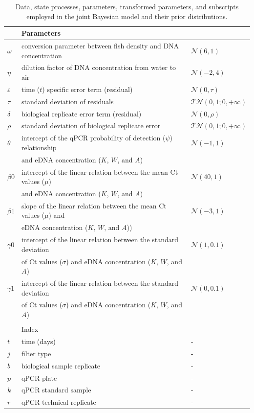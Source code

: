 \documentclass{article}
\begin{document}
\begin{table}[tbhp]
\begin{tabular}{lll}
&Parameters&\\
\hline
$\omega$& conversion parameter between fish density
and DNA concentration & $\mathcal{N}(6,1)$\\
$\eta$& dilution factor of DNA concentration
from water to air & $\mathcal{N}(-2,4)$\\
$\varepsilon$& time ($t$) specific error term (residual) & $\mathcal{N}(0,\tau)$\\
$\tau$& standard deviation of residuals & $\mathcal{TN}(0,1;0, +\infty)$\\
$\delta$& biological replicate error term (residual) & $\mathcal{N}(0,\rho)$\\
$\rho$& standard deviation of biological replicate error & $\mathcal{TN}(0,1;0, +\infty)$\\
$\theta$& intercept of the qPCR probability of detection ($\psi$) relationship &$\mathcal{N}(-1,1)$\\
& and eDNA concentration ($K$, $W$, and $A$) \\
$\beta0$& intercept of the linear relation between the mean Ct values ($\mu$)&$\mathcal{N}(40,1)$\\
&and eDNA concentration ($K$, $W$, and $A$) & \\
$\beta1$& slope of the linear relation between the mean Ct values ($\mu$) and &$\mathcal{N}(-3,1)$\\
&eDNA concentration ($K$, $W$, and $A$)) & \\
$\gamma0$& intercept of the linear relation between the standard deviation&$\mathcal{N}(1,0.1)$\\
&of Ct values ($\sigma$) and eDNA concentration ($K$, $W$, and $A$) & \\
$\gamma1$& intercept of the linear relation between the standard deviation &$\mathcal{N}(0,0.1)$\\
&of Ct values ($\sigma$) and eDNA concentration ($K$, $W$, and $A$) & \\
&&\\
&Index&\\
\hline
$t$& time (days) & -\\
$j$& filter type & -\\
$b$& biological sample replicate & -\\
$p$& qPCR plate & -\\
$k$& qPCR standard sample & -\\
$r$& qPCR technical replicate & -\\

    \end{tabular}
    \caption{Data, state processes, parameters, transformed parameters, and subscripts employed in the joint Bayesian model and their prior distributions.}
    \label{tab:priortable}
\end{table}
\end{document}
